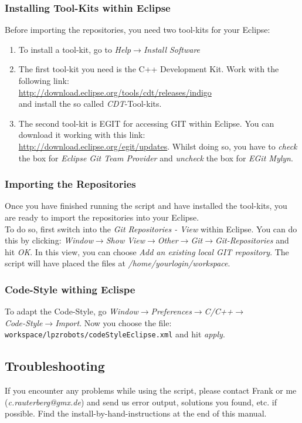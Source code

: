 \subsubsection{Installing Tool-Kits within Eclipse} 
Before importing the repositories, you need two tool-kits for your Eclipse:
\begin{enumerate}
 \item To install a tool-kit, go to \emph{Help}$\rightarrow$\emph{Install Software}
 \item The first tool-kit you need is the C++ Development Kit. Work with the following link:\\ \url{http://download.eclipse.org/tools/cdt/releases/indigo} \\ and install the so called \emph{CDT}-Tool-kits.
 \item The second tool-kit is EGIT for accessing GIT within Eclipse. You can download it working with this link:\\ \url{http://download.eclipse.org/egit/updates}. Whilst doing so, you have to \emph{check} the box for \emph{Eclipse Git Team Provider} and \emph{uncheck} the box for \emph{EGit Mylyn}.
\end{enumerate}

\subsubsection{Importing the Repositories}

Once you have finished running the script and have installed the tool-kits, you are ready to import the repositories into your Eclipse. \\
To do so, first switch into the \emph{Git Repositories - View} within Eclipse. You can do this by clicking: \emph{Window}$\rightarrow$\emph{Show View}$\rightarrow$\emph{Other}$\rightarrow$\emph{Git}$\rightarrow$\emph{Git-Repositories} and hit \emph{OK}.
In this view, you can choose \emph{Add an existing local GIT repository}. The script will have placed the files at \emph{/home/yourlogin/workspace}.

\subsubsection{Code-Style withing Eclispe}
To adapt the Code-Style, go \emph{Window}$\rightarrow$\emph{Preferences}$\rightarrow$\emph{C/C++}$\rightarrow$ \\ \emph{Code-Style}$\rightarrow$\emph{Import}. Now you choose the file:\\ \nolinkurl{workspace/lpzrobots/codeStyleEclipse.xml} and hit \emph{apply}.

\subsection{Troubleshooting}

If you encounter any problems while using the script, please contact Frank or me (\emph{c.rauterberg@gmx.de}) and send us error output, solutions you found, etc. if possible. Find the install-by-hand-instructions at the end of this manual.